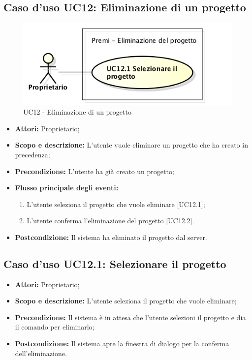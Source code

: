 \subsection{Caso d'uso UC12: Eliminazione di un progetto}
\begin{figure}[h] 
	\centering 
	\includegraphics[scale=0.45] {img/UC12.png} 
	\caption{UC12 - Eliminazione di un progetto} 
\end{figure}

\begin{itemize}
	\item \textbf{Attori:} Proprietario;
	\item \textbf{Scopo e descrizione:} L'utente vuole eliminare un progetto che ha creato in precedenza;
	\item \textbf{Precondizione:} L'utente ha già creato un progetto;
	\item \textbf{Flusso principale degli eventi:}
	\begin{enumerate}
		\item L'utente seleziona il progetto che vuole eliminare [UC12.1];
		\item L'utente conferma l'eliminazione del progetto [UC12.2].
	\end{enumerate}
	\item \textbf{Postcondizione:} Il sistema ha eliminato il progetto dal server.
\end{itemize}


\subsection{Caso d'uso UC12.1: Selezionare il progetto}
\begin{itemize}
	\item \textbf{Attori:} Proprietario;
	\item \textbf{Scopo e descrizione:} L'utente seleziona il progetto che vuole eliminare;
	\item \textbf{Precondizione:} Il sistema è in attesa che l'utente selezioni il progetto e dia il comando per eliminarlo;
	\item \textbf{Postcondizione:} Il sistema apre la finestra di dialogo per la conferma dell'eliminazione.
\end{itemize}


